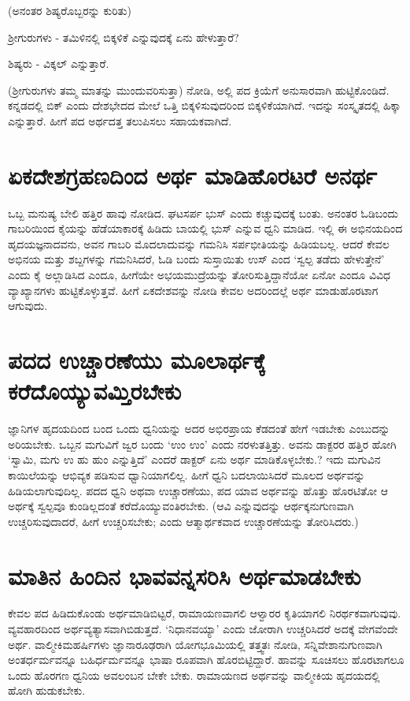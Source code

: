 (ಅನಂತರ ಶಿಷ್ಯರೊಬ್ಬರನ್ನು ಕುರಿತು)

ಶ್ರೀಗುರುಗಳು - ತಮಿಳಿನಲ್ಲಿ ಬಿಕ್ಕಳಿಕೆ ಎನ್ನುವುದಕ್ಕೆ ಏನು ಹೇಳುತ್ತಾರೆ?

ಶಿಷ್ಯರು - ವಿಕ್ಕಲ್ ಎನ್ನುತ್ತಾರೆ. 

(ಶ್ರೀಗುರುಗಳು ತಮ್ಮ ಮಾತನ್ನು ಮುಂದುವರಿಸುತ್ತಾ) ನೋಡಿ, ಅಲ್ಲಿ ಪದ ಕ್ರಿಯೆಗೆ ಅನುಸಾರವಾಗಿ ಹುಟ್ಟಿಕೊಂಡಿದೆ. ಕನ್ನಡದಲ್ಲಿ ಬಿಕ್ ಎಂದು ದೇಶಭೇದದ ಮೇಲೆ ಒತ್ತಿ ಬಿಕ್ಕಳಿಸುವುದರಿಂದ ಬಿಕ್ಕಳಿಕೆಯಾಗಿದೆ. ಇದನ್ನು ಸಂಸ್ಕೃತದಲ್ಲಿ ಹಿಕ್ಕಾ‌ ಎನ್ನುತ್ತಾರೆ. ಹೀಗೆ ಪದ ಅರ್ಥದತ್ತ ತಲುಪಿಸಲು ಸಹಾಯಕವಾಗಿದೆ. 

\section*{ಏಕದೇಶಗ್ರಹಣದಿಂದ ಅರ್ಥ ಮಾಡಿಹೊರಟರೆ ಅನರ್ಥ}

ಒಬ್ಬ ಮನುಷ್ಯ ಬೇಲಿ ಹತ್ತಿರ ಹಾವು ನೋಡಿದ. ಘಟಸರ್ಪ ಭುಸ್ ಎಂದು ಕಚ್ಚುವುದಕ್ಕೆ ಬಂತು. ಅನಂತರ ಓಡಿಬಂದು ಗಾಬರಿಯಿಂದ ಕೈಯನ್ನು ಹೆಡೆಯಾಕಾರಕ್ಕೆ ಹಿಡಿದು ಬಾಯಲ್ಲಿ ಭುಸ್ ಎನ್ನುವ ಧ್ವನಿ ಮಾಡಿದ. ಇಲ್ಲಿ ಈ ಅಭಿನಯದಿಂದ ಹೃದಯಜ್ಞನಾದವನು, ಅವನ ಗಾಬರಿ ಮೊದಲಾದುವನ್ನು ಗಮನಿಸಿ ಸರ್ಪಭೀತಿಯನ್ನು ಹಿಡಿಯಬಲ್ಲ. ಆದರೆ ಕೇವಲ ಅಭಿನಯ ಮತ್ತು ಶಬ್ದಗಳನ್ನು ಗಮನಿಸಿದರೆ, ಓಡಿ ಬಂದು ಸುಸ್ತಾಯಿತು ಉಸ್ ಎಂದ `ಸ್ವಲ್ಪ ತಡೆದು ಹೇಳುತ್ತೇನೆ' ಎಂದು ಕೈ ಅಲ್ಲಾಡಿಸಿದ ಎಂದೂ, ಹೀಗೆಯೇ ಅಭಯಮುದ್ರೆಯನ್ನು ತೋರಿಸುತ್ತಿದ್ದಾನೆಯೋ ಏನೋ ಎಂದೂ ವಿವಿಧ ವ್ಯಾಖ್ಯಾನಗಳು ಹುಟ್ಟಿಕೊಳ್ಳುತ್ತವೆ. ಹೀಗೆ ಏಕದೇಶವನ್ನು ನೋಡಿ ಕೇವಲ ಅದರಿಂದಲ್ಲೆ ಅರ್ಥ ಮಾಡುಹೊರಟಾಗ ಆಗುವುದು. 

\section*{ಪದದ ಉಚ್ಚಾರಣೆಯು ಮೂಲಾರ್ಥಕ್ಕೆ ಕರೆದೊಯ್ಯುವಮ್ತಿರಬೇಕು}

ಜ್ಞಾನಿಗಳ ಹೃದಯದಿಂದ ಬಂದ ಒಂದು ಧ್ವನಿಯನ್ನು ಅದರ ಅಭಿರಪ್ರಾಯ ಕೆಡದಂತೆ ಹೇಗೆ ಇಡಬೇಕು ಎಂಬುದನ್ನು ಅರಿಯಬೇಕು. ಒಬ್ಬನ ಮಗುವಿಗೆ ಜ್ವರ ಬಂದು `ಉಂ ಉಂ' ಎಂದು ನರಳುತತ್ತಿತ್ತು. ಅವನು ಡಾಕ್ಟರರ ಹತ್ತಿರ ಹೋಗಿ `ಸ್ವಾಮಿ, ಮಗು ಉ ಹು ಹುಂ ಎನ್ನುತ್ತಿದೆ' ಎಂದರೆ ಡಾಕ್ಟರ್ ಏನು ಅರ್ಥ ಮಾಡಿಕೊಳ್ಳಬೇಕು.? ಇದು ಮಗುವಿನ ಕಾಯಿಲೆಯನ್ನು ಆಭಿವ್ಯಕ ಪಡಿಸುವ ಧ್ವಾನಿಯಾಗಲಿಲ್ಲ. ಹೀಗೆ ಧ್ವನಿ ಬದಲಾಯಿಸಿದರೆ ಮೂಲದ ಅರ್ಥವನ್ನು ಹಿಡಿಯಲಾಗುವುದಿಲ್ಲ. ಪದದ ಧ್ವನಿ ಅಥವಾ ಉಚ್ಚಾರಣೆಯು, ಪದ ಯಾವ ಅರ್ಥವನ್ನು ಹೊತ್ತು ಹೊರಟಿತೋ ಆ ಅರ್ಥಕ್ಕೆ ಸ್ವಲ್ಪವೂ ಕುಂಡಿಲ್ಲದಂತೆ ಕರೆದೊಯ್ಯುವಂತಿರಬೇಕು. (ಆವಿ ಎನ್ನುವುದನ್ನು  ಆರ್ಥಕ್ಕನುಗುಣವಾಗಿ ಉಚ್ಚರಿಸುವುದಾದರೆ, ಹೀಗೆ ಉಚ್ಚರಿಸಬೇಕು; ಎಂದು ಆತ್ಮಾರ್ಥಕವಾದ ಉಚ್ಚಾರಣೆಯನ್ನು ತೋರಿಸಿದರು.)

\section*{ಮಾತಿನ ಹಿಂದಿನ ಭಾವವನ್ನಸರಿಸಿ ಅರ್ಥಮಾಡಬೇಕು}

ಕೇವಲ ಪದ ಹಿಡಿದುಕೊಂಡು ಅರ್ಥಮಾಡಿಬಿಟ್ಟರೆ, ರಾಮಾಯಣವಾಗಲಿ ಆಳ್ವಾರರ ಕೃತಿಯಾಗಲಿ ನಿರರ್ಥಕವಾಗುವುವು. ವ್ಯವಹಾರದಿಂದ ಅರ್ಥವ್ಯತ್ಯಾಸವಾಗಿಬಿಡುತ್ತದೆ. `ನಿಧಾನವಯ್ಯಾ' ಎಂದು ಜೋರಾಗಿ ಉಚ್ಚರಿಸಿದರೆ ಅದಕ್ಕೆ ವೇಗವೆಂದೇ ಅರ್ಥ. ವಾಲ್ಮೀಕಿಮಹರ್ಷಿಗಳು ಜ್ಞಾನಾರೂಢರಾಗಿ ಯೋಗಭೂಮಿಯಲ್ಲಿ ತತ್ತ್ವತಃ ನೋಡಿ, ಸನ್ನಿವೇಶಾನುಗುಣವಾಗಿ ಅಂತರ್ಧರ್ಮವನ್ನೂ ಬಹಿರ್ಧರ್ಮವನ್ನೂ ಭಾಷಾ ರೂಪವಾಗಿ ಹೊರಬಿಟ್ಟಿದ್ದಾರೆ. ಹಾವನ್ನು ಸೂಚಿಸಲು ಹೊರಟಾಗಲೂ ಒಂದು ಹೊರಗಣ ಧ್ವನಿಯ ಅವಲಂಬನ ಬೇಕೇ ಬೇಕು. ರಾಮಾಯಣದ ಅರ್ಥವನ್ನು ವಾಲ್ಮೀಕಿಯ ಹೃದಯದಲ್ಲಿ ಹೋಗಿ ಹುಡುಕಬೇಕು.

